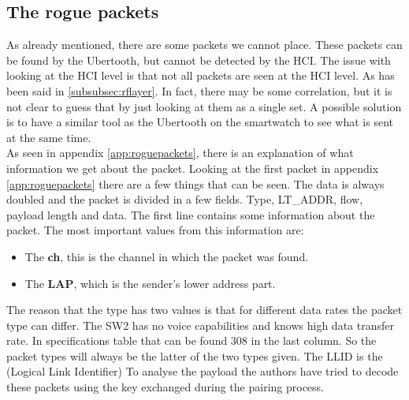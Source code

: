 \subsection{The rogue packets}
As already mentioned, there are some packets we cannot place. These packets can be found by the Ubertooth, but cannot be detected by the HCI. The issue with looking at the HCI level is that not all packets are seen at the HCI level. As has been said in \ref{subsubsec:rflayer}. In fact, there may be some correlation, but it is not clear to guess that by just looking at them as a single set. A possible solution is to have a similar tool as the Ubertooth on the smartwatch to see what is sent at the same time. \\
As seen in appendix \ref{app:roguepackets}, there is an explanation of what information we get about the packet.
Looking at the first packet in appendix \ref{app:roguepackets} there are a few things that can be seen. The data is always doubled and the packet is divided in a few fields. Type, LT\_ADDR, flow, payload length and data. The first line contains some information about the packet. The most important values from this information are:
\begin{itemize} 
\item The \textbf{ch}, this is the channel in which the packet was found.
\item The \textbf{LAP}, which is the sender's lower address part.
\end{itemize}
The reason that the type has two values is that for different data rates the packet type can differ. The SW2 has no voice capabilities and knows high data transfer rate. In specifications table that can be found 308 in the last column. So the packet types will always be the latter of the two types given.
The LLID is the (Logical Link Identifier)
To analyse the payload the authors have tried to decode these packets using the key exchanged during the pairing process.
